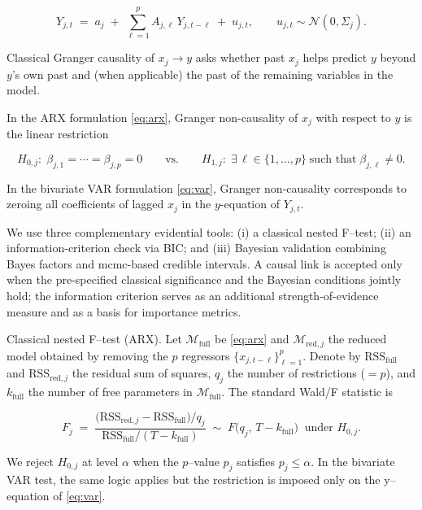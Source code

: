 \documentclass[preprint, 3p,
authoryear]{elsarticle} %
\begin{document}
\begin{equation}
Y_{j,t} \;=\; a_j \;+\; \sum_{\ell=1}^{p}A_{j,\ell}\,Y_{j,t-\ell} \;+\; u_{j,t},\qquad u_{j,t}\sim \mathcal{N}(0,\Sigma_j).
\label{eq:var}
\end{equation}

Classical Granger causality of \(x_j \to y\) asks whether past \(x_j\)
helps predict \(y\) beyond \(y\)'s own past and (when applicable) the
past of the remaining variables in the model.

In the ARX formulation \eqref{eq:arx}, Granger non-causality of \(x_j\)
with respect to \(y\) is the linear restriction

\begin{equation}
H_{0,j}:\;\beta_{j,1}=\cdots=\beta_{j,p}=0
\qquad\text{vs.}\qquad
H_{1,j}:\;\exists\,\ell\in\{1,\dots,p\}\;\text{such that}\;\beta_{j,\ell}\neq 0.
\label{eq:h0}
\end{equation}

In the bivariate VAR formulation \eqref{eq:var}, Granger non-causality
corresponds to zeroing all coefficients of lagged \(x_j\) in the
\(y\)-equation of \(Y_{j,t}\).

We use three complementary evidential tools: (i) a classical nested
F--test; (ii) an information-criterion check via BIC; and (iii) Bayesian
validation combining Bayes factors and \gls{mcmc}-based credible
intervals. A causal link is accepted only when the pre-specified
classical significance and the Bayesian conditions jointly hold; the
information criterion serves as an additional strength-of-evidence
measure and as a basis for importance metrics.

Classical nested F--test (ARX). Let \(\mathcal{M}_{\text{full}}\) be
\eqref{eq:arx} and \(\mathcal{M}_{\text{red},j}\) the reduced model
obtained by removing the \(p\) regressors
\(\{x_{j,t-\ell}\}_{\ell=1}^{p}\). Denote by
\(\mathrm{RSS}_{\text{full}}\) and \(\mathrm{RSS}_{\text{red},j}\) the
residual sum of squares, \(q_j\) the number of restrictions (\(=p\)),
and \(k_{\text{full}}\) the number of free parameters in
\(\mathcal{M}_{\text{full}}\). The standard Wald/F statistic is

\begin{equation}
F_j \;=\; \frac{\big(\mathrm{RSS}_{\text{red},j}-\mathrm{RSS}_{\text{full}}\big)/q_j}{\mathrm{RSS}_{\text{full}}/(T-k_{\text{full}})}
\;\sim\; F\big(q_j,\,T-k_{\text{full}}\big)\;\;\text{under }H_{0,j}.
\label{eq:Ftest}
\end{equation}

We reject \(H_{0,j}\) at level \(\alpha\) when the \(p\)--value \(p_j\)
satisfies \(p_j\le \alpha\). In the bivariate VAR test, the same logic
applies but the restriction is imposed only on the y--equation of
\eqref{eq:var}.
\end{document}
